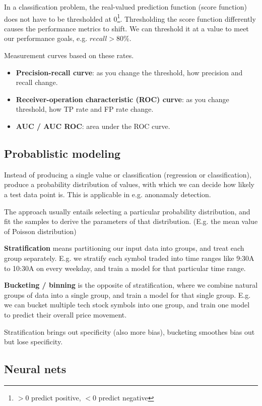 \documentclass{article}
\begin{document}
In a classification problem, the real-valued prediction function (score function) does not have to be thresholded at 0\footnote{$> 0$ predict positive, $< 0$ predict negative}.
Thresholding the score function differently causes the performance metrics to shift.
We can threshold it at a value to meet our performance goals, e.g. $recall > 80\%$.

Measurement curves based on these rates.
\begin{itemize}
\item \textbf{Precision-recall curve}: as you change the threshold, how precision and recall change.
\item \textbf{Receiver-operation characteristic (ROC) curve}: as you change threshold, how TP rate and FP rate change.
\item \textbf{AUC / AUC ROC}: area under the ROC curve.
\end{itemize}

\subsection{Probablistic modeling}

Instead of producing a single value or classification (regression or classification), produce a probability distribution of values, with which we can decide how likely a test data point is.
This is applicable in e.g. anonamaly detection.

The approach usually entails selecting a particular probability distribution, and fit the samples to derive the parameters of that distribution. (E.g. the mean value of Poisson distribution)

\textbf{Stratification} means partitioning our input data into groups, and treat each group separately.
E.g. we stratify each symbol traded into time ranges like 9:30A to 10:30A on every weekday, and train a model for that particular time range.

\textbf{Bucketing / binning} is the opposite of stratification, where we combine natural groups of data into a single group, and train a model for that single group.
E.g. we can bucket multiple tech stock symbols into one group, and train one model to predict their overall price movement.

Stratification brings out specificity (also more bias), bucketing smoothes bias out but lose specificity.


\subsection{Neural nets}
\end{document}
